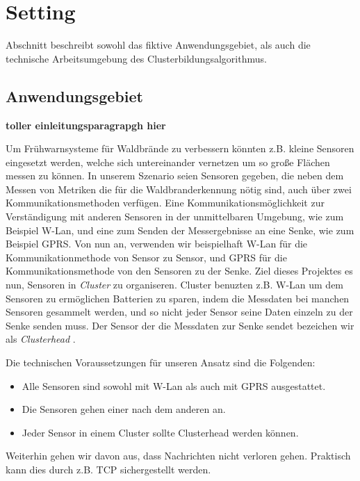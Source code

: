 \section{Setting} \label{sec:set}
 Abschnitt beschreibt sowohl das fiktive Anwendungsgebiet, als auch die technische Arbeitsumgebung des Clusterbildungsalgorithmus.



\subsection{Anwendungsgebiet}
\textbf{toller einleitungsparagrapgh hier}

Um Fr\"uhwarnsysteme f\"ur Waldbr\"ande zu verbessern k\"onnten z.B. kleine Sensoren eingesetzt werden, welche sich untereinander vernetzen um so gro\ss e Fl\"achen messen zu k\"onnen.
In unserem Szenario seien Sensoren gegeben, die neben dem Messen von Metriken die f\"ur die Waldbranderkennung n\"otig sind, auch \"uber zwei Kommunikationsmethoden verf\"ugen. Eine Kommunikationsm\"oglichkeit zur Verst\"andigung mit anderen Sensoren in der unmittelbaren Umgebung, wie zum Beispiel W-Lan, und eine zum Senden der Messergebnisse an eine Senke, wie zum Beispiel GPRS.
Von nun an, verwenden wir beispielhaft W-Lan f\"ur die Kommunikationmethode von Sensor zu Sensor, und GPRS f\"ur die Kommunikationsmethode von den Sensoren zu der Senke.
Ziel dieses Projektes es nun, Sensoren in \emph{Cluster} zu organiseren.
Cluster benuzten z.B. W-Lan um dem Sensoren zu erm\"oglichen Batterien zu sparen, indem die Messdaten bei manchen Sensoren gesammelt werden, und so nicht jeder Sensor seine Daten einzeln zu der Senke senden muss.
Der Sensor der die Messdaten zur Senke sendet bezeichen wir als \emph{Clusterhead} .

Die technischen Voraussetzungen f\"ur unseren Ansatz sind die Folgenden:
\begin{itemize}
\item Alle Sensoren sind sowohl mit W-Lan als auch mit GPRS ausgestattet.
\item Die Sensoren gehen einer nach dem anderen an.
\item Jeder Sensor in einem Cluster sollte Clusterhead werden k\"onnen.
\end{itemize}

Weiterhin gehen wir davon aus, dass Nachrichten nicht verloren gehen.
Praktisch kann dies durch z.B. TCP sichergestellt werden.
